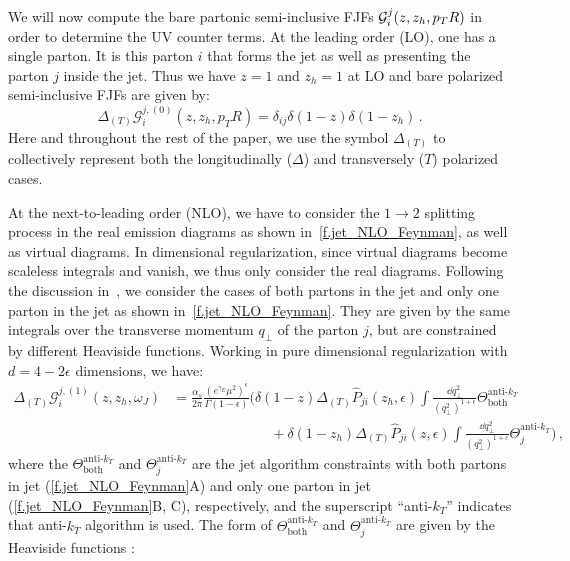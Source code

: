 \documentclass[a4paper, 11 pt]{article}
\begin{document}
We will now compute the bare partonic semi-inclusive FJFs $\mathcal{G}_i^j \pqty{z, z_h, p_TR}$ in order to determine the UV counter terms. At the leading order (LO), one has a single parton. It is this parton $i$ that forms the jet as well as presenting the parton $j$ inside the jet. Thus we have $z=1$ and $z_h=1$ at LO and bare polarized semi-inclusive FJFs are given by:
\begin{equation}
\Delta _{(T)} \mathcal{G} _i^{j, (0)} (z, z_h, p_TR) = \delta_{ij}\delta (1 - z) \delta (1 - z_h)\, .
\end{equation}
Here and throughout the rest of the paper, we use the symbol $\Delta _{(T)}$ to collectively represent both the longitudinally ($\Delta$) and transversely ($T$) polarized cases.

At the next-to-leading order (NLO), we have to consider the $1\to 2$ splitting process in the real emission diagrams as shown in~\cref{f.jet_NLO_Feynman}, as well as virtual diagrams. In dimensional regularization, since virtual diagrams become scaleless integrals and vanish, we thus only consider the real diagrams. Following the discussion in~\cite{Kang:2016ehg}, we consider the cases of both partons in the jet and only one parton in the jet as shown in~\cref{f.jet_NLO_Feynman}.
They are given by the same integrals over the transverse momentum $q_{\bot}$ of the parton $j$, but are constrained by different Heaviside functions.
Working in pure dimensional regularization with $d = 4 - 2 \epsilon$ dimensions, we have:
\begin{align}
\label{e.bare_collinear_FJF_1}
\Delta _{(T)} \mathcal{G}_i^{j, (1)} (z, z_h, \omega_J)
& =
\frac{\alpha _s}{2 \pi} \frac{(e^{\gamma _E} \mu^2)^{\epsilon}}{\Gamma (1-\epsilon)}
\bigg(
\delta (1-z) \Delta _{(T)} \hat{P}_{ji} (z_h, \epsilon)
\int\frac{\dd{q_{\perp}^2}}{(q_{\perp}^2)^{1 + \epsilon}} \Theta ^{\text{anti-}k_T}_{\mathrm{both}}
\nonumber \\
& \qquad \qquad \qquad \quad +
\delta (1-z_h) \Delta _{(T)} \hat{P}_{ji}(z, \epsilon)
\int \frac{\dd{q_{\perp}^2}}{(q_{\perp}^2)^{1 + \epsilon}} \Theta ^{\text{anti-}k_T}_{j}
\bigg)
\, ,
\end{align}
where the $\Theta ^{\text{anti-}k_T}_{\mathrm{both}}$ and $\Theta ^{\text{anti-}k_T}_{j}$ are the jet algorithm constraints with both partons in jet (\cref{f.jet_NLO_Feynman}A) and only one parton in jet (\cref{f.jet_NLO_Feynman}B, C), respectively, and the superscript ``anti-$k_T$'' indicates that anti-$k_T$ algorithm is used.
The form of $\Theta ^{\text{anti-}k_T}_{\mathrm{both}}$ and $\Theta ^{\text{anti-}k_T}_{j}$ are given by the Heaviside functions \cite{Ellis:2010rwa,Kang:2016ehg,Kang:2017mda}:
\end{document}
